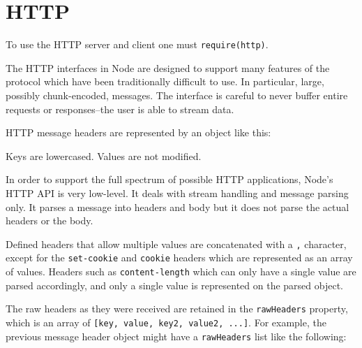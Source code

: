 \section{HTTP}\label{http}

\begin{Shaded}
\begin{Highlighting}[]
 
\end{Highlighting}
\end{Shaded}

To use the HTTP server and client one must
\texttt{require(\textquotesingle{}http\textquotesingle{})}.

The HTTP interfaces in Node are designed to support many features of the
protocol which have been traditionally difficult to use. In particular,
large, possibly chunk-encoded, messages. The interface is careful to
never buffer entire requests or responses--the user is able to stream
data.

HTTP message headers are represented by an object like this:

\begin{Shaded}
\begin{Highlighting}[]
\NormalTok{\{ }\NormalTok{: }\NormalTok{,}
  \NormalTok{: }\NormalTok{,}
  \NormalTok{: }\NormalTok{,}
  \NormalTok{: }\NormalTok{,}
  \NormalTok{: } \NormalTok{\}}
\end{Highlighting}
\end{Shaded}

Keys are lowercased. Values are not modified.

In order to support the full spectrum of possible HTTP applications,
Node's HTTP API is very low-level. It deals with stream handling and
message parsing only. It parses a message into headers and body but it
does not parse the actual headers or the body.

Defined headers that allow multiple values are concatenated with a
\texttt{,} character, except for the \texttt{set-cookie} and
\texttt{cookie} headers which are represented as an array of values.
Headers such as \texttt{content-length} which can only have a single
value are parsed accordingly, and only a single value is represented on
the parsed object.

The raw headers as they were received are retained in the
\texttt{rawHeaders} property, which is an array of
\texttt{{[}key,\ value,\ key2,\ value2,\ ...{]}}. For example, the
previous message header object might have a \texttt{rawHeaders} list
like the following:

